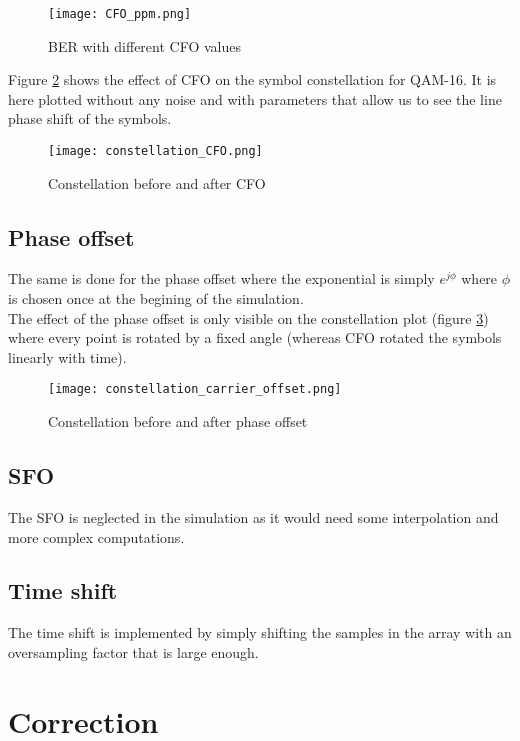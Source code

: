 \begin{figure}[H]
    \centering
    \texttt{[image: CFO\_ppm.png]}
    \caption{BER with different CFO values}
    \label{fig:CFO_BER}
\end{figure}

Figure \ref{fig:CFO_const} shows the effect of CFO on the symbol constellation for QAM-16. It is here plotted without any noise and with parameters that allow us to see the line phase shift of the symbols. \\

\begin{figure}[H]
    \centering
    \texttt{[image: constellation\_CFO.png]}
    \caption{Constellation before and after CFO}
    \label{fig:CFO_const}
\end{figure}

\subsection{Phase offset}
The same is done for the phase offset where the exponential is simply $e^{j\phi}$ where $\phi$ is chosen once at the begining of the simulation. \\

The effect of the phase offset is only visible on the constellation plot (figure \ref{fig:phaseOffsetConst}) where every point is rotated by a fixed angle (whereas CFO rotated the symbols linearly with time). \\

\begin{figure}[H]
    \centering
    \texttt{[image: constellation\_carrier\_offset.png]}
    \caption{Constellation before and after phase offset}
    \label{fig:phaseOffsetConst}
\end{figure}

\subsection{SFO}
The SFO is neglected in the simulation as it would need some interpolation and more complex computations. \\
\subsection{Time shift}
The time shift is implemented by simply shifting the samples in the array with an oversampling factor that is large enough. \\

\section{Correction}


